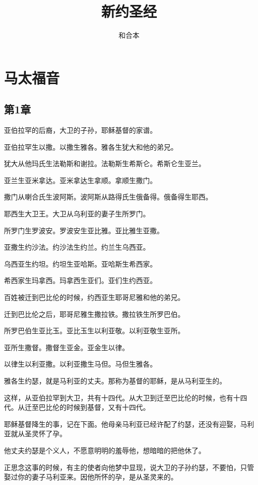 \documentclass[12pt,oneside]{book}
\title{新约圣经}
\author{和合本}
\begin{document}

\frontmatter


\setcounter{tocdepth}{2}    
\tableofcontents

\mainmatter
\part{马太福音}
\chapter{第1章}
亚伯拉罕的后裔，大卫的子孙，耶稣基督的家谱。

亚伯拉罕生以撒。以撒生雅各。雅各生犹大和他的弟兄。

犹大从他玛氏生法勒斯和谢拉。法勒斯生希斯仑。希斯仑生亚兰。

亚兰生亚米拿达。亚米拿达生拿顺。拿顺生撒门。

撒门从喇合氏生波阿斯。波阿斯从路得氏生俄备得。俄备得生耶西。

耶西生大卫王。大卫从乌利亚的妻子生所罗门。

所罗门生罗波安。罗波安生亚比雅。亚比雅生亚撒。

亚撒生约沙法。约沙法生约兰。约兰生乌西亚。

乌西亚生约坦。约坦生亚哈斯。亚哈斯生希西家。

希西家生玛拿西。玛拿西生亚们。亚们生约西亚。

百姓被迁到巴比伦的时候，约西亚生耶哥尼雅和他的弟兄。

迁到巴比伦之后，耶哥尼雅生撒拉铁。撒拉铁生所罗巴伯。

所罗巴伯生亚比玉。亚比玉生以利亚敬。以利亚敬生亚所。

亚所生撒督。撒督生亚金。亚金生以律。

以律生以利亚撒。以利亚撒生马但。马但生雅各。

雅各生约瑟，就是马利亚的丈夫。那称为基督的耶稣，是从马利亚生的。

这样，从亚伯拉罕到大卫，共有十四代。从大卫到迁至巴比伦的时候，也有十四代。从迁至巴比伦的时候到基督，又有十四代。

耶稣基督降生的事，记在下面。他母亲马利亚已经许配了约瑟，还没有迎娶，马利亚就从圣灵怀了孕。

他丈夫约瑟是个义人，不愿意明明的羞辱他，想暗暗的把他休了。

正思念这事的时候，有主的使者向他梦中显现，说大卫的子孙约瑟，不要怕，只管娶过你的妻子马利亚来。因他所怀的孕，是从圣灵来的。
\end{document}
